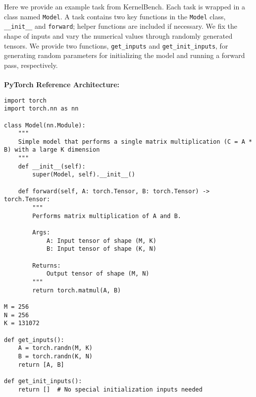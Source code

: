 Here we provide an example task from KernelBench. Each task is wrapped in a class named \texttt{Model}. A task contains two key functions in the \texttt{Model} class, \texttt{\_\_init\_\_} and \texttt{forward}; helper functions are included if necessary. We fix the shape of inputs and vary the numerical values through randomly generated tensors. We provide two functions, \texttt{get\_inputs} and \texttt{get\_init\_inputs}, for generating random parameters for initializing the model and running a forward pass, respectively.
\\\\
\noindent \textbf{PyTorch Reference Architecture:}
\begin{lstlisting}
import torch
import torch.nn as nn

class Model(nn.Module):
    """
    Simple model that performs a single matrix multiplication (C = A * B) with a large K dimension
    """
    def __init__(self):
        super(Model, self).__init__()
    
    def forward(self, A: torch.Tensor, B: torch.Tensor) -> torch.Tensor:
        """
        Performs matrix multiplication of A and B.

        Args:
            A: Input tensor of shape (M, K)
            B: Input tensor of shape (K, N)

        Returns:
            Output tensor of shape (M, N)
        """
        return torch.matmul(A, B)

M = 256
N = 256
K = 131072

def get_inputs():
    A = torch.randn(M, K)
    B = torch.randn(K, N)
    return [A, B]

def get_init_inputs():
    return []  # No special initialization inputs needed
\end{lstlisting}

